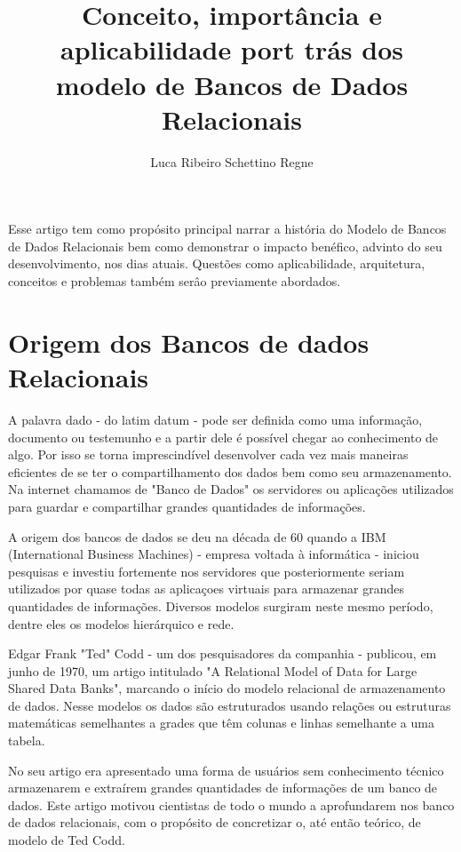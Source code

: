 \documentclass[12pt]{article}
\title{Conceito, importância e aplicabilidade  port trás dos \\ modelo de Bancos de Dados Relacionais\\}
\author{Luca Ribeiro Schettino Regne\inst{1}}
\begin{document}
 

\maketitle

\begin{resumo}
    Esse artigo tem como propósito principal narrar a história do Modelo de Bancos de Dados Relacionais bem como demonstrar o impacto benéfico, advinto do seu desenvolvimento, nos dias atuais. Questões como aplicabilidade, arquitetura, conceitos e problemas também serâo previamente abordados.
\end{resumo}


\section{Origem dos Bancos de dados Relacionais}
A palavra dado - do latim datum - pode ser definida como uma informação, documento ou testemunho e a partir dele é possível chegar ao conhecimento de algo. Por isso se torna imprescindível desenvolver cada vez mais maneiras eficientes de se ter o compartilhamento dos dados bem como seu armazenamento. Na internet chamamos de "Banco de Dados" os servidores ou aplicações utilizados para guardar e compartilhar grandes quantidades de informações.

A origem dos bancos de dados se deu na década de 60 quando a IBM (International Business Machines) - empresa voltada à informática - iniciou pesquisas e investiu fortemente nos servidores que posteriormente seriam utilizados por quase todas as aplicaçoes virtuais para armazenar grandes quantidades de informações. Diversos modelos surgiram neste mesmo período, dentre eles os modelos hierárquico e rede.

Edgar Frank "Ted" Codd - um dos pesquisadores da companhia - publicou,  em junho de 1970,  um artigo intitulado "A Relational Model of Data for Large Shared Data Banks", marcando o início do modelo relacional de armazenamento de dados.  Nesse modelos os dados são estruturados usando relações ou estruturas matemáticas semelhantes a grades que têm colunas e linhas semelhante a uma tabela.

No seu artigo era apresentado uma forma de usuários sem conhecimento técnico armazenarem e extraírem grandes quantidades de informações de um banco de dados. Este artigo motivou cientistas de todo o mundo a aprofundarem nos banco de dados relacionais, com o propósito de concretizar o, até então teórico, de modelo de Ted Codd.
\end{document}
